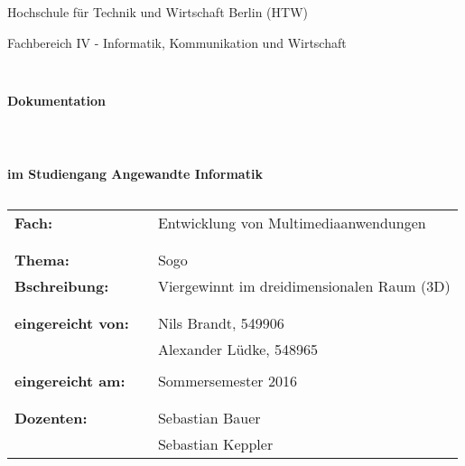\documentclass[a4paper]{scrartcl}
\begin{document}
%
%
\thispagestyle{empty}

\begin{center}
\Large{Hochschule für Technik und Wirtschaft Berlin (HTW)}\\
\end{center}
 
 
\begin{center}
\Large{Fachbereich IV - Informatik, Kommunikation und Wirtschaft}
\end{center}
\begin{verbatim}


\end{verbatim}
\begin{center}
\textbf{\LARGE{Dokumentation}}
\end{center}
\begin{verbatim}
 
 
\end{verbatim}
\begin{center}
\textbf{im Studiengang Angewandte Informatik}
\end{center}
\begin{verbatim}
\end{verbatim}
 
\begin{flushleft}
\begin{tabular}{lll}
\textbf{Fach:} & & Entwicklung von Multimediaanwendungen\\
& & \\
& & \\
\textbf{Thema:} & & Sogo\\
\textbf{Bschreibung:}& & Viergewinnt im dreidimensionalen Raum (3D) \\
& & \\
& & \\
\textbf{eingereicht von:} & & Nils Brandt, 549906 \\
& & Alexander Lüdke, 548965 \\
& & \\
\textbf{eingereicht am:} & &  Sommersemester 2016 \\
& & \\
& & \\
\textbf{Dozenten:} & & Sebastian Bauer \\
& & 	Sebastian Keppler
\end{tabular}
\end{flushleft}
\end{document}
